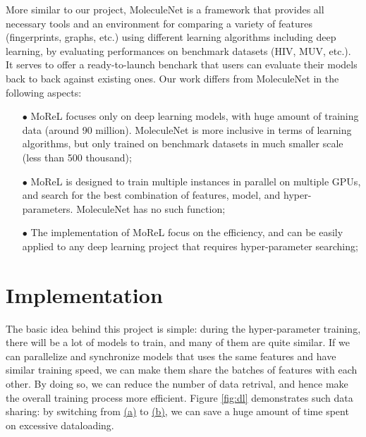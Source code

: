 \documentclass[conference]{IEEEtran}
\begin{document}
More similar to our project, MoleculeNet \cite{molnet} is a framework that provides all necessary tools and an environment for comparing a variety of features (fingerprints, graphs, etc.) using different learning algorithms including deep learning, by evaluating performances on benchmark datasets (HIV, MUV, etc.). 
It serves to offer a ready-to-launch benchark that users can evaluate their models back to back against existing ones. 
Our work differs from MoleculeNet in the following aspects:
\begin{itemize}
	\item[$\bullet$]  MoReL focuses only on deep learning models, with huge amount of training data (around 90 million). MoleculeNet is more inclusive in terms of learning algorithms, but only trained on benchmark datasets in much smaller scale (less than 500 thousand);
	\item[$\bullet$]  MoReL is designed to train multiple instances in parallel on multiple GPUs, and search for the best combination of features, model, and hyper-parameters. MoleculeNet has no such function;
	\item[$\bullet$]  The implementation of MoReL focus on the efficiency, and can be easily applied to any deep learning project that requires hyper-parameter searching; 
\end{itemize}

\section{Implementation} \label{sec_impl} 

The basic idea behind this project is simple: during the hyper-parameter training, there will be a lot of models to train, and many of them are quite similar. 
If we can parallelize and synchronize models that uses the same features and have similar training speed, we can make them share the batches of features with each other. 
By doing so, we can reduce the number of data retrival, and hence make the overall training process more efficient. 
Figure \ref{fig:dl} demonstrates such data sharing: by switching from \hyperref[dl_a]{(a)} to \hyperref[dl_b]{(b)}, we can save a huge amount of time spent on excessive dataloading.
\end{document}
